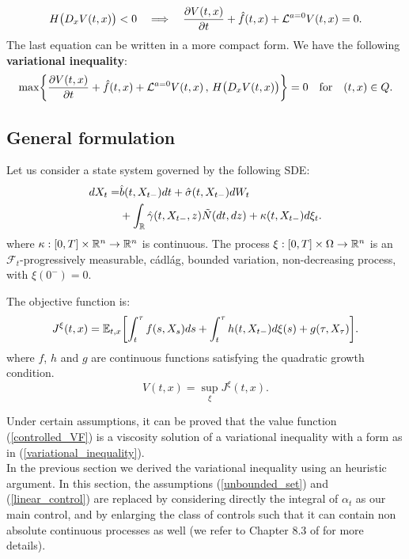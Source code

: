 \begin{equation}
 H\bigl( D_x V(t,x) \bigr) < 0 \quad \Longrightarrow \quad  \frac{\partial V(t,x)}{\partial t} + \hat f(t,x) + \mathcal{L}^{a=0}V(t,x) = 0.
\end{equation}
The last equation can be written in a more compact form. We have the following \textbf{variational inequality}:
\begin{equation}\label{variational_inequality}
 \max \biggl\{ \frac{\partial V(t,x)}{\partial t} + \hat f(t,x) + \mathcal{L}^{a=0}V(t,x) \,,\, H\bigl( D_x V(t,x) \bigr) \biggr \} =0 \quad \mbox{for} \quad (t,x)\in Q. 
\end{equation}

\subsection{General formulation}

Let us consider a state system governed by the following SDE:
\begin{align}\label{singular_SDE}
 dX_t =& \hat b(t,X_{t-}) dt + \hat \sigma (t,X_{t-}) dW_t \\ \nonumber
      &+ \int_{\mathbb{R}} \hat \gamma(t,X_{t-},z) \tilde N(dt,dz) + \kappa(t,X_{t-}) d\xi_t .
\end{align}
where $\kappa : [0,T] \times \mathbb{R}^n \to \mathbb{R}^n$ is continuous. 
The process $\xi : [0,T] \times \Omega \to \mathbb{R}^n$ is an $\mathcal{F}_t$-progressively measurable, cádlág, bounded variation, 
non-decreasing process, with $\xi(0^-) = 0$.   

The objective function is:
\begin{equation}\label{singular_cost_functional}
 J^{\xi}(t,x) = \mathbb{E}_{t,x} \biggl[ \int_t^{\tau} f(s,X_s) ds + \int_t^{\tau} h(t,X_{t-}) d\xi(s) + g(\tau, X_{\tau}) \biggr] . 
\end{equation}
where $f$, $h$ and $g$ are continuous functions satisfying the quadratic growth condition. 
\begin{equation}\label{controlled_VF}
 V(t,x) = \sup_{\xi} J^{\xi}(t,x).
\end{equation}

Under certain assumptions, it can be proved that the value function (\ref{controlled_VF}) is a viscosity solution of a variational inequality 
with a form as in (\ref{variational_inequality}).\\

\noindent
In the previous section we derived the variational inequality using an heuristic argument. In this section, the assumptions (\ref{unbounded_set}) and (\ref{linear_control})
are replaced by considering directly the integral of $\alpha_t$ as our main control, and by enlarging the class of controls such that it can contain non absolute continuous processes
as well (we refer to Chapter 8.3 of \cite{FlemingSoner} for more details). 


